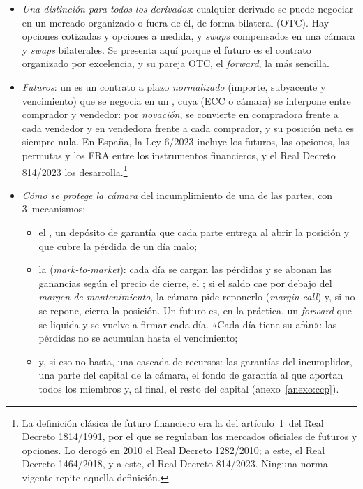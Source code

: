 \documentclass[11pt]{article}
\begin{document}
\begin{itemize}
\item \emph{Una distinción para todos los derivados}: cualquier derivado se puede negociar en un mercado organizado o fuera de él, de forma bilateral (OTC). Hay opciones cotizadas y opciones a medida, y \emph{swaps} compensados en una cámara y \emph{swaps} bilaterales. Se presenta aquí porque el futuro es el contrato organizado por excelencia, y su pareja OTC, el \emph{forward}, la más sencilla.
\item \emph{Futuros}: un  es un contrato a plazo \emph{normalizado} (importe, subyacente y vencimiento) que se negocia en un , cuya  (ECC o cámara) se interpone entre comprador y vendedor: por \emph{novación}, se convierte en compradora frente a cada vendedor y en vendedora frente a cada comprador, y su posición neta es siempre nula\nocite{Hull2022Options}. En España, la Ley 6/2023 incluye los futuros, las opciones, las permutas y los FRA entre los instrumentos financieros\nocite{Ley6_2023}, y el Real Decreto 814/2023 los desarrolla\nocite{BOE2023RD814}.\footnote{La definición clásica de futuro financiero era la del artículo~1~del Real Decreto 1814/1991, por el que se regulaban los mercados oficiales de futuros y opciones\nocite{BOE1991RD1814}. Lo derogó en 2010 el Real Decreto 1282/2010; a este, el Real Decreto 1464/2018, y a este, el Real Decreto 814/2023. Ninguna norma vigente repite aquella definición.}
\item \emph{Cómo se protege la cámara} del incumplimiento de una de las partes, con 3~mecanismos\nocite{Hull2022Options}:
  \begin{itemize}
  \item el , un depósito de garantía que cada parte entrega al abrir la posición y que cubre la pérdida de un día malo;
  \item la  (\emph{mark-to-market}): cada día se cargan las pérdidas y se abonan las ganancias según el precio de cierre, el ; si el saldo cae por debajo del \emph{margen de mantenimiento}, la cámara pide reponerlo (\emph{margin call}) y, si no se repone, cierra la posición. Un futuro es, en la práctica, un \emph{forward} que se liquida y se vuelve a firmar cada día. «Cada día tiene su afán»: las pérdidas no se acumulan hasta el vencimiento;
  \item y, si eso no basta, una cascada de recursos: las garantías del incumplidor, una parte del capital de la cámara, el fondo de garantía al que aportan todos los miembros y, al final, el resto del capital (anexo~\ref{anexo:ccp}).

\end{itemize}
\end{itemize}
\end{document}
